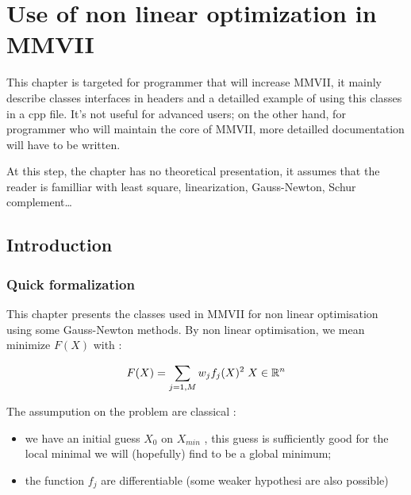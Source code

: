

\chapter{Use of non linear optimization in MMVII}

\label{Chap:NLO}

This chapter is targeted for programmer that will increase MMVII, it mainly describe classes
interfaces in headers and a detailled example of using this classes in a cpp file.
 It's not useful for advanced users; on the other hand, for programmer who will maintain the core of MMVII, 
more detailled documentation will have to be written.

At this step, the chapter has no theoretical presentation, it assumes that the reader is familliar
with least square, linearization, Gauss-Newton, Schur complement\dots



\section{Introduction}


\subsection{Quick formalization}

This chapter presents the classes used in MMVII for non linear optimisation using some Gauss-Newton methods. 
By non linear optimisation, we mean minimize $F(X)$ with :

\begin{equation}
      F(X) = \sum_{j=1,M} w_j f_j(X)^2  \;  X \in \mathbb{R}^n  \label{EqNLOInit}
\end{equation}

The assumpution on the problem are classical :

\begin{itemize}
   \item we have an initial guess $X_0$ on $X_{min}$  , this guess is sufficiently 
         good for the local minimal we will (hopefully) find to be a global minimum;

   \item the function $f_j$ are differentiable (some weaker hypothesi are also possible)

\end{itemize}

